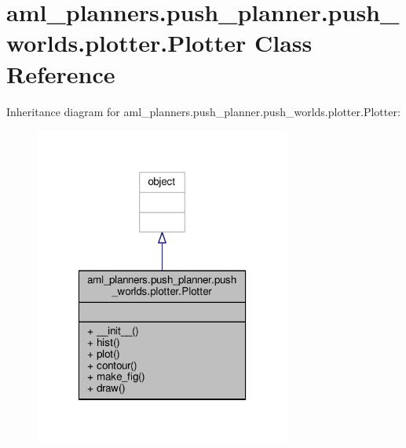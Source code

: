 \hypertarget{classaml__planners_1_1push__planner_1_1push__worlds_1_1plotter_1_1_plotter}{\section{aml\-\_\-planners.\-push\-\_\-planner.\-push\-\_\-worlds.\-plotter.\-Plotter Class Reference}
\label{classaml__planners_1_1push__planner_1_1push__worlds_1_1plotter_1_1_plotter}
}


Inheritance diagram for aml\-\_\-planners.\-push\-\_\-planner.\-push\-\_\-worlds.\-plotter.\-Plotter\-:
\nopagebreak
\begin{figure}[H]
\begin{center}
\leavevmode
\includegraphics[width=238pt]{classaml__planners_1_1push__planner_1_1push__worlds_1_1plotter_1_1_plotter__inherit__graph}
\end{center}
\end{figure}


